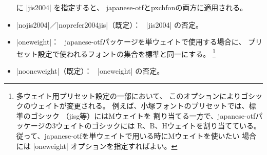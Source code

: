 \documentclass[uplatex,dvipdfmx,a4paper]{jsarticle}
\newcommand{\Pkg}[1]{\textsf{#1}}
\newcommand{\Means}{：\ }
\begin{document}
\begin{itemize}
  に |jis2004| を指定すると、
  \Pkg{japanese-otf}と\Pkg{pxchfon}の両方に適用される。
\item |nojis2004|／|noprefer2004jis|（既定）\Means
  |jis2004| の否定。
\item |oneweight|\Means
  \Pkg{japanese-otf}パッケージを単ウェイトで使用する場合に、
  プリセット設定で使われるフォントの集合を{\pTeX}標準と同一にする。
  \footnote{多ウェイト用プリセット設定の一部において、
  このオプションによりゴシックのウェイトが変更される。
  例えば、小塚フォントのプリセットでは、{\pTeX}標準のゴシック
  （jisg等）にはMウェイトを
  割り当てる一方で、\Pkg{japanese-otf}パッケージの3ウェイトのゴシックには
  R、B、Hウェイトを割り当てている。
  従って、\Pkg{japanese-otf}を単ウェイトで用いる時にMウェイトを使いたい
  場合には |oneweight| オプションを指定すればよい。}
\item |nooneweight|（既定）\Means
  |oneweight| の否定。
\end{itemize}
\end{document}
